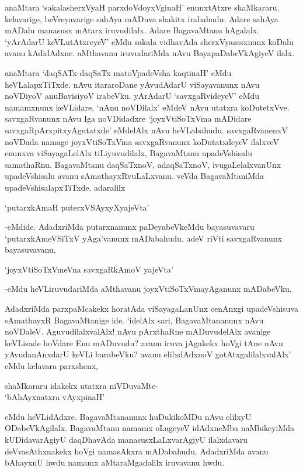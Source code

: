 anaMtara `sakalasherxVyaH parxdoVdoyxVginaH' enunxtAtxre shaMkararu. kelavarige, beVreyavarige sahAya mADuva shakitx irabahudu. Adare sahAya mADalu manasusx mAtarx iruvudilalx. Adare BagavaMtanu hAgalalx. `yArAdarU keVLutAtxreyeV' eMdu sakala vidhavAda sherxVyasasxnunx koDalu avanu kAdidAdxne. aMthavanu iruvudariMda nAvu BayapaDabeVkAgiyeV ilalx.

anaMtara `daqSATx-daqSaTx matoVpadeVsha kaqtinaH' eMdu heVLalapxTiTxde. nAvu itararoDane yAvudAdarU viSayavanunx nAvu noVDiyoV anuBavisiyoV irabeVku. yArAdarU `savxgaRvideyeV' eMdu namamxnunx keVLidare, `nAnu noVDilalx' eMdeV nAvu utatxra koDutetxVve. savxgaRvanunx nAvu Iga noVDidadxre `joyxVtiSoTxVma mADidare savxgaRpArxpitxyAgutatxde' eMdelAlx nAvu heVLabahudu. savxgaRvanenxV noVDada namage joyxVtiSoTxVma savxgaRvanunx koDutatxdeyeV ilalxveV enunxva viSayagaLelAlx tiLiyuvudilalx, BagavaMtanu upadeVshisalu samathaRnu. BagavaMtanu daqSaTxnoV, adaqSaTxnoV, ivugaLelalxvanUnx upadeVshisalu avanu sAmathayxRvuLaLxvanu. veVda BagavaMtaniMda upadeVshisalapxTiTxde. adaralilx

\begin{shloka}
`putarxkAmaH puterxVSAyxyXyajeVta'
\end{shloka}

-eMdide. AdadxriMda putarxnanunx paDeyabeVkeMdu bayasuvavaru `putarxkAmeVSiTxV yAga'vanunx mADabahudu. adeV riVti savxgaRvanunx bayasuvavanu,

\begin{shloka}
`joyxVtiSoTxVmeVna savxgaRkAmoV yajeVta'
\end{shloka}

-eMdu heVLiruvudariMda aMthavanu joyxVtiSoTxVmayAganunx mADabeVku.

AdadxriMda parxpaMcakekx horatAda viSayagaLanUnx cenAnxgi upadeVshisuva sAmathayxR BagavaMtanige ide. `idelAlx sari, BagavaMtananunx nAvu noVDaleV. AguvudilalxvalAlx! nAvu pArxthaRne mADuvudelAlx avanige keVLisade hoVdare Enu mADuvudu? avanu iruva jAgakekx hoVgi tAne nAvu yAvudanAnxdarU keVLi barabeVku? avanu elilxdAdxnoV gotAtxgalilalxvalAlx' eMdu kelavara parxshenx,

\begin{center}
shaMkararu idakekx utatxra niVDuvaMte-\\
`bAhAyxnatxra vAyxpinaH'
\end{center}

eMdu heVLidAdxre. BagavaMtananunx huDukikoMDu nAvu elilxyU ODabeVkAgilalx. BagavaMtanu namamx oLageyeV idAdxneMba naMbikeyiMda kUDidavarAgiyU daqDhavAda manasusxLaLxvarAgiyU ilalxdavaru deVvasAthxnakekx hoVgi namasAkxra mADabahudu. AdadxriMda avanu bAhayxnU hwdu namamx aMtaraMgadalilx iruvavanu hwdu.

